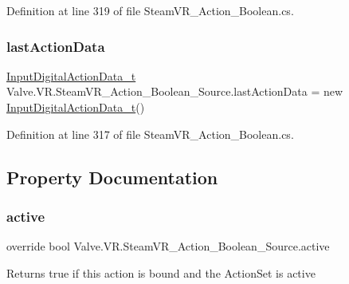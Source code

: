 Definition at line 319 of file Steam\+V\+R\+\_\+\+Action\+\_\+\+Boolean.\+cs.

\mbox{\label{class_valve_1_1_v_r_1_1_steam_v_r___action___boolean___source_a8da087502c6d74720661c51b921ebb3b}} 
\subsubsection{\texorpdfstring{lastActionData}{lastActionData}}
{\footnotesize\ttfamily \mbox{\hyperlink{struct_valve_1_1_v_r_1_1_input_digital_action_data__t}{Input\+Digital\+Action\+Data\+\_\+t}} Valve.\+V\+R.\+Steam\+V\+R\+\_\+\+Action\+\_\+\+Boolean\+\_\+\+Source.\+last\+Action\+Data = new \mbox{\hyperlink{struct_valve_1_1_v_r_1_1_input_digital_action_data__t}{Input\+Digital\+Action\+Data\+\_\+t}}()\hspace{0.3cm}{\ttfamily [protected]}}



Definition at line 317 of file Steam\+V\+R\+\_\+\+Action\+\_\+\+Boolean.\+cs.



\subsection{Property Documentation}
\mbox{\label{class_valve_1_1_v_r_1_1_steam_v_r___action___boolean___source_ae7f38ff0c9baf560ab3df37206ea19db}} 
\subsubsection{\texorpdfstring{active}{active}}
{\footnotesize\ttfamily override bool Valve.\+V\+R.\+Steam\+V\+R\+\_\+\+Action\+\_\+\+Boolean\+\_\+\+Source.\+active\hspace{0.3cm}{\ttfamily [get]}}



Returns true if this action is bound and the Action\+Set is active 



